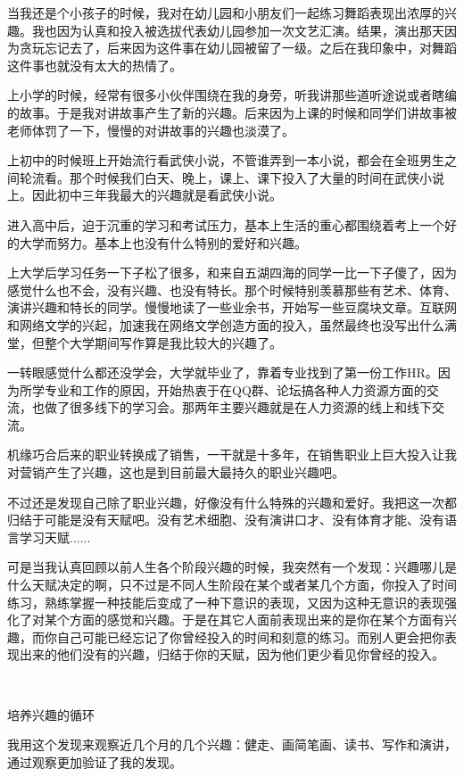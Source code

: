 \documentclass[11pt,a4paper]{article}
\begin{document}
﻿当我还是个小孩子的时候，我对在幼儿园和小朋友们一起练习舞蹈表现出浓厚的兴趣。我也因为认真和投入被选拔代表幼儿园参加一次文艺汇演。结果，演出那天因为贪玩忘记去了，后来因为这件事在幼儿园被留了一级。之后在我印象中，对舞蹈这件事也就没有太大的热情了。﻿﻿

上小学的时候，经常有很多小伙伴围绕在我的身旁，听我讲那些道听途说或者瞎编的故事。于是我对讲故事产生了新的兴趣。后来因为上课的时候和同学们讲故事被老师体罚了一下，慢慢的对讲故事的兴趣也淡漠了。﻿﻿

上初中的时候班上开始流行看武侠小说，不管谁弄到一本小说，都会在全班男生之间轮流看。那个时候我们白天、晚上，课上、课下投入了大量的时间在武侠小说上。因此初中三年我最大的兴趣就是看武侠小说。﻿﻿

进入高中后，迫于沉重的学习和考试压力，基本上生活的重心都围绕着考上一个好的大学而努力。基本上也没有什么特别的爱好和兴趣。﻿﻿

上大学后学习任务一下子松了很多，和来自五湖四海的同学一比一下子傻了，因为感觉什么也不会，没有兴趣、也没有特长。那个时候特别羡慕那些有艺术、体育、演讲兴趣和特长的同学。慢慢地读了一些业余书，开始写一些豆腐块文章。互联网和网络文学的兴起，加速我在网络文学创造方面的投入，虽然最终也没写出什么满堂，但整个大学期间写作算是我比较大的兴趣了。﻿﻿

一转眼感觉什么都还没学会，大学就毕业了，靠着专业找到了第一份工作HR。因为所学专业和工作的原因，开始热衷于在QQ群、论坛搞各种人力资源方面的交流，也做了很多线下的学习会。那两年主要兴趣就是在人力资源的线上和线下交流。﻿﻿

机缘巧合后来的职业转换成了销售，一干就是十多年，在销售职业上巨大投入让我对营销产生了兴趣，这也是到目前最大最持久的职业兴趣吧。﻿﻿

不过还是发现自己除了职业兴趣，好像没有什么特殊的兴趣和爱好。我把这一次都归结于可能是没有天赋吧。没有艺术细胞、没有演讲口才、没有体育才能、没有语言学习天赋......﻿﻿

可是当我认真回顾以前人生各个阶段兴趣的时候，我突然有一个发现：兴趣哪儿是什么天赋决定的啊，只不过是不同人生阶段在某个或者某几个方面，你投入了时间练习，熟练掌握一种技能后变成了一种下意识的表现，又因为这种无意识的表现强化了对某个方面的感觉和兴趣。于是在其它人面前表现出来的是你在某个方面有兴趣，而你自己可能已经忘记了你曾经投入的时间和刻意的练习。而别人更会把你表现出来的他们没有的兴趣，归结于你的天赋，因为他们更少看见你曾经的投入。﻿﻿

﻿

培养兴趣的循环

我用这个发现来观察近几个月的几个兴趣：健走、画简笔画、读书、写作和演讲，通过观察更加验证了我的发现。﻿﻿
\end{document}
